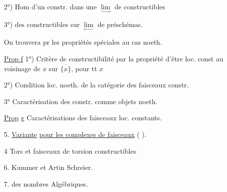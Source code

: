 2°) Hom d'un constr. dans une $\underset{\longrightarrow}{\lim}$ de constructibles

3°)  des constructibles sur $\underset{\longleftarrow}{\lim}$ de préschémas.


On trouvera pr les propriétés spéciales au cas noeth.

\uline{Prop f} 1°) Critère de constructibilité par la propriété d'être loc. const au voisinage de $x$ sur $\overline{\{x\}}$, pour tt $x$

2°) Condition loc. noeth. de la catégorie des faisceaux constr.

3°  Caractérisation des constr. comme objets noeth.

\uline{Prop} g \quad Caractérisations des faisceaux loc. constants.

5. \uline{Variante} \uline{pour les complexes de faisceaux}  ( ).

 4 Tors et faisceaux de torsion constructibles

6. Kummer et Artin Schreier.

7.  des nombres Algébriques.



